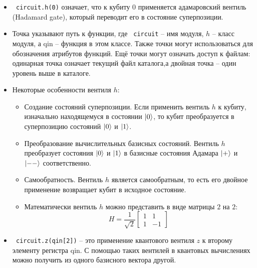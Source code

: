 \documentclass[12pt,a4paper]{article}
\begin{document}
\begin{itemize}
		\item	\texttt{	circuit.h(0)} означает, что к кубиту $0$ применяется адамаровский вентиль (Hadamard gate), который переводит его в состояние суперпозиции.
		
		\item	Точка указывают путь к функции, где \texttt{ circuit} -- имя модуля, $h$ -- класс модуля, а qin -- функция в этом классе. Также точки могут использоваться для обозначения атрибутов функций. Ещё точки могут означать доступ к файлам: одинарная точка означает текущий файл каталога,а двойная точка -- один уровень выше в каталоге.
		
		\item		Некоторые особенности вентиля $h$:
		\begin{itemize}
			\item		Создание состояний суперпозиции. Если применить вентиль $h$ к кубиту, изначально находящемуся в состоянии $\ket{0}$, то кубит преобразуется в суперпозицию состояний $\ket{0}$ и $\ket{1}$.
			
			\item		Преобразование вычислительных базисных состояний. Вентиль $h$ преобразует состояния $\ket{0}$ и $\ket{1}$ в базисные состояния Адамара $\ket{+}$ и  $\ket{--}$ соответственно. 
			\item		Самообратность. Вентиль $h$ является самообратным, то есть его двойное применение возвращает кубит в исходное состояние.
			\item		Математически вентиль $h$ можно представить в виде матрицы $2$ на $2$: 
			\begin{equation}
				H =\frac{1}{\sqrt{2}} \begin{bmatrix}
					1 & 1 \\
					1 & -1
				\end{bmatrix}
			\end{equation}
		\end{itemize}
		\item \texttt{	circuit.z(qin[2])} -- это применение квантового вентиля $z$ к второму элементу регистра qin.  С помощью таких вентилей в квантовых вычислениях можно получить из одного базисного вектора другой.
		

\end{itemize}
\end{document}
